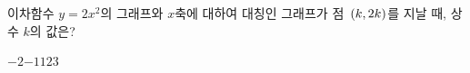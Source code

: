 이차함수 $y=2x^2$의 그래프와 $x$축에 대하여 대칭인 그래프가 점~$(k{,}\mkern3mu 2k)$를 지날 때, 상수 $k$의 값은? 
\begin{choices32}{$-2$}{$-1$}{$1$}{$2$}{$3$}\end{choices32}
